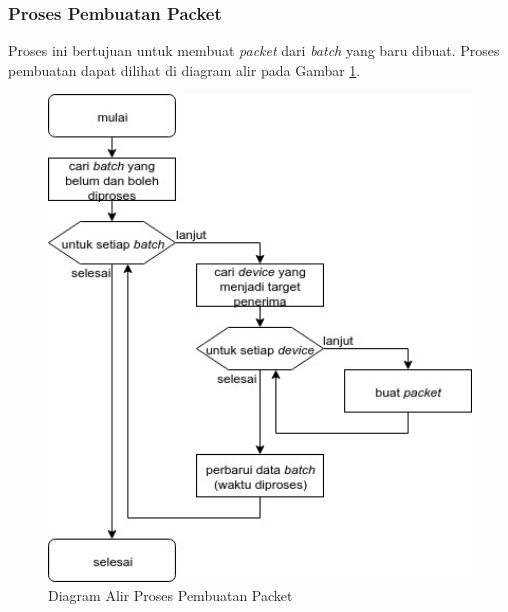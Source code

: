 \subsubsection{Proses Pembuatan Packet}
\par Proses ini bertujuan untuk membuat \textit{packet} dari \textit{batch} yang baru dibuat. Proses pembuatan dapat dilihat di diagram alir pada Gambar \ref{flowchart_pembuatan_packet}.
\begin{figure}[H]
	\centering\includegraphics[width=1\textwidth]{bab3/img/flowchart-pembuatan_packet.jpg}
	\caption{Diagram Alir Proses Pembuatan Packet} \label{flowchart_pembuatan_packet}
\end{figure}

